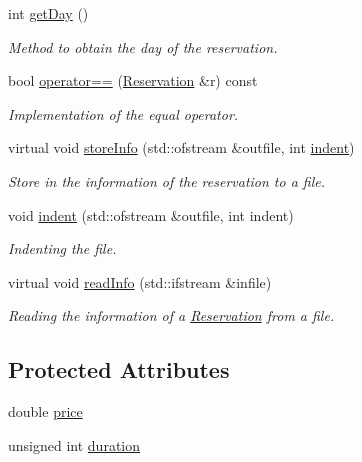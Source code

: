 \begin{DoxyCompactItemize}
int \mbox{\hyperlink{class_reservation_a22d66f6cc7532b775d5a05338ad6b196}{get\+Day}} ()
\begin{DoxyCompactList}\small\item\em Method to obtain the day of the reservation. \end{DoxyCompactList}\item 
bool \mbox{\hyperlink{class_reservation_ae033fc48c694b375e0cc68215f7dcfdb}{operator==}} (\mbox{\hyperlink{class_reservation}{Reservation}} \&r) const
\begin{DoxyCompactList}\small\item\em Implementation of the equal operator. \end{DoxyCompactList}\item 
virtual void \mbox{\hyperlink{class_reservation_a8ec83fe2eb15294c3a51a9998ed17df7}{store\+Info}} (std\+::ofstream \&outfile, int \mbox{\hyperlink{class_reservation_a480981ed050bae19bc74bbb0bbb459f9}{indent}})
\begin{DoxyCompactList}\small\item\em Store in the information of the reservation to a file. \end{DoxyCompactList}\item 
void \mbox{\hyperlink{class_reservation_a480981ed050bae19bc74bbb0bbb459f9}{indent}} (std\+::ofstream \&outfile, int indent)
\begin{DoxyCompactList}\small\item\em Indenting the file. \end{DoxyCompactList}\item 
virtual void \mbox{\hyperlink{class_reservation_acff32024a350c2156af9f74522c59b7b}{read\+Info}} (std\+::ifstream \&infile)
\begin{DoxyCompactList}\small\item\em Reading the information of a \mbox{\hyperlink{class_reservation}{Reservation}} from a file. \end{DoxyCompactList}\end{DoxyCompactItemize}
\subsection*{Protected Attributes}
\begin{DoxyCompactItemize}
\item 
double \mbox{\hyperlink{class_reservation_a82e197bd30e7949ee9b8616ee4eacf83}{price}}
\item 
unsigned int \mbox{\hyperlink{class_reservation_a1a311bb23edebfa226f9c744aefdc7b1}{duration}}
\end{DoxyCompactItemize}


